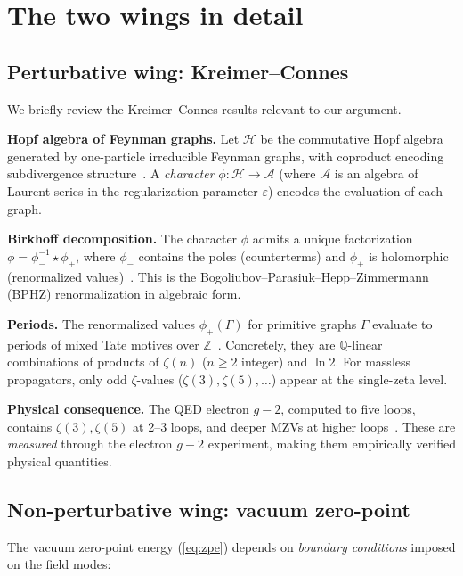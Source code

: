 \documentclass[11pt,a4paper]{article}
\begin{document}
\section{The two wings in detail}

\subsection{Perturbative wing: Kreimer--Connes}

We briefly review the Kreimer--Connes results relevant to our
argument.

\textbf{Hopf algebra of Feynman graphs.}
Let $\mathcal{H}$ be the commutative Hopf algebra generated by
one-particle irreducible Feynman graphs, with coproduct encoding
subdivergence structure~\cite{Kreimer1998}. A \emph{character}
$\phi: \mathcal{H} \to \mathcal{A}$ (where $\mathcal{A}$ is an
algebra of Laurent series in the regularization parameter
$\varepsilon$) encodes the evaluation of each graph.

\textbf{Birkhoff decomposition.}
The character $\phi$ admits a unique factorization
$\phi = \phi_-^{-1} \star \phi_+$, where $\phi_-$ contains the
poles (counterterms) and $\phi_+$ is holomorphic (renormalized
values)~\cite{CK2000}. This is the Bogoliubov--Parasiuk--Hepp--Zimmermann
(BPHZ) renormalization in algebraic form.

\textbf{Periods.}
The renormalized values $\phi_+(\Gamma)$ for primitive graphs
$\Gamma$ evaluate to periods of mixed Tate motives over
$\mathbb{Z}$~\cite{Brown2015}. Concretely, they are
$\mathbb{Q}$-linear combinations of products of $\zeta(n)$
($n \geq 2$ integer) and $\ln 2$. For massless propagators, only
odd $\zeta$-values ($\zeta(3), \zeta(5), \ldots$) appear at the
single-zeta level.

\textbf{Physical consequence.}
The QED electron $g-2$, computed to five loops, contains
$\zeta(3), \zeta(5)$ at 2--3 loops, and deeper MZVs at higher
loops~\cite{Laporta2017,Aoyama2020}. These are \emph{measured}
through the electron $g-2$ experiment, making them empirically
verified physical quantities.

\subsection{Non-perturbative wing: vacuum zero-point}

The vacuum zero-point energy (\ref{eq:zpe}) depends on
\emph{boundary conditions} imposed on the field modes:
\end{document}

